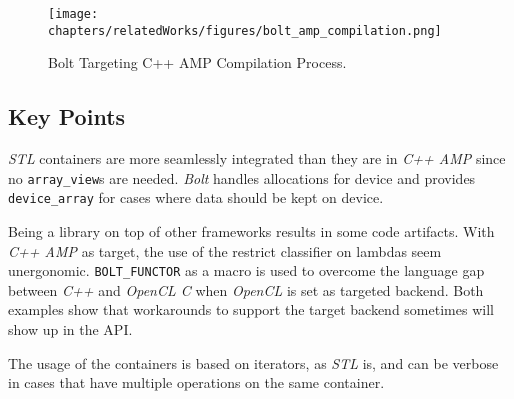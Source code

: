 \begin{figure}
\center
\texttt{[image: chapters/relatedWorks/figures/bolt\_amp\_compilation.png]}
\caption{Bolt Targeting C++ AMP Compilation Process.}
\label{fig:boltAmpCompilation}
\end{figure}

\subsection{Key Points}
\textit{STL} containers are more seamlessly integrated than they are in \textit{C++ AMP} since no \texttt{array\_view}s are needed. \textit{Bolt} handles allocations for device and provides \texttt{device_array} for cases where data should be kept on device.

Being a library on top of other frameworks results in some code artifacts. With \textit{C++ AMP} as target, the use of the restrict classifier on lambdas seem unergonomic. \texttt{BOLT\_FUNCTOR} as a macro is used to overcome the language gap between \textit{C++} and \textit{OpenCL C} when \textit{OpenCL} is set as targeted backend. Both examples show that workarounds to support the target backend sometimes will show up in the API. 

The usage of the containers is based on iterators, as \textit{STL} is, and can be verbose in cases that have multiple operations on the same container.
